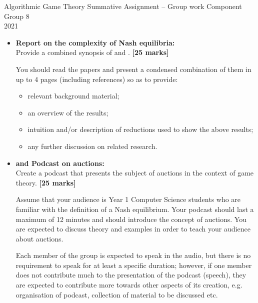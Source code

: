 \documentclass{article}
\begin{document}
\begin{center}
	\LARGE{Algorithmic Game Theory Summative Assignment -- Group work Component}\\[0.1cm]
	\Large{Group 8}\\[0.1cm]
	2021\\[0.5cm]
\end{center}

\begin{itemize}
	\item \textbf{Report on the complexity of Nash equilibria:}\\Provide a combined synopsis of \cite{DGP} and \cite{FPT}. \hfill{\bf [25 marks]}\smallskip
	
	You should read the papers and present a condensed combination of them in up to 4 pages (including references) so as to provide:
	
	\begin{itemize}
		
		\item relevant background material;
		
		\item an overview of the results;
		
		\item intuition and/or description of reductions used to show the above results;
		
		\item any further discussion on related research.
		
	\end{itemize}

	\item \textbf{and Podcast on auctions:}\\Create a podcast that presents the subject of auctions in the context of game theory. \hfill{\bf [25 marks]}\smallskip
	
	Assume that your audience is Year 1 Computer Science students who are familiar with the definition of a Nash equilibrium. Your podcast should last a maximum of 12 minutes and should introduce the concept of auctions. You are expected to discuss theory and examples in order to teach your audience about auctions.
	
	Each member of the group is expected to speak in the audio, but there is no requirement to speak for at least a specific duration; however, if one member does not contribute much to the presentation of the podcast (speech), they are expected to contribute more towards other aspects of its creation, e.g. organisation of podcast, collection of material to be discussed etc.
	

\end{itemize}
\end{document}
